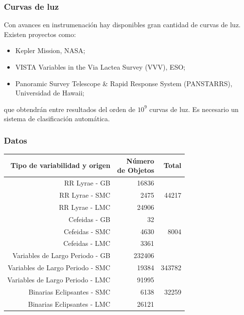 \documentclass{beamer}
\begin{document}
\begin{frame}
  \frametitle{Curvas de luz}
  Con avances en instrumenación hay disponibles gran cantidad de curvas de luz. Existen proyectos como:
  \begin{itemize}
  \item Kepler Mission, NASA;
  \item VISTA Variables in the Via Lactea Survey (VVV), ESO;
  \item Panoramic Survey Telescope \& Rapid Response System (PANSTARRS), Universidad de Hawaii;
  \end{itemize}
  que obtendrán entre resultados del orden de $10^9$ curvas de luz. Es necesario un sistema de clasificación automática.
\end{frame}

\begin{frame}
  \frametitle{Datos}
  \begin{table}
    \centering  
    \resizebox{0.6\textwidth}{!} {
      \begin{tabular}{rrr}
        \hline
        \hline
        Tipo de variabilidad y origen & \shortstack{Número \\de Objetos} & Total \\
        \hline
        \hline 
        RR Lyrae - GB\cite{soszynski_optical_2011-2} & 16836& \\
        RR Lyrae - SMC \cite{soszynski_optical_2010}& 2475&  44217\\
        RR Lyrae - LMC \cite{soszynski_optical_2009-1}& 24906& \\
        \hline
        Cefeidas - GB \cite{soszynski_optical_2011}& 32 & \\%
        Cefeidas - SMC \cite{soszynski_optical_2010-2}& 4630 & 8004\\
        Cefeidas - LMC \cite{soszynski_optical_2008-1}& 3361 & \\
        \hline
        Variables de Largo Periodo - GB \cite{soszynski_optical_2013-1}& 232406 & \\
        Variables de Largo Periodo - SMC \cite{soszynski_optical_2011-1}& 19384 & 343782\\
        Variables de Largo Periodo -  LMC\cite{soszynski_optical_2009}& 91995 & \\
        \hline
        Binarias Eclipsantes - SMC \cite{pawlak_eclipsing_2013}& 6138 & 32259\\
        Binarias Eclipsantes - LMC \cite{graczyk_optical_2011}& 26121 & \\

\end{tabular}}
\end{table}
\end{frame}
\end{document}
